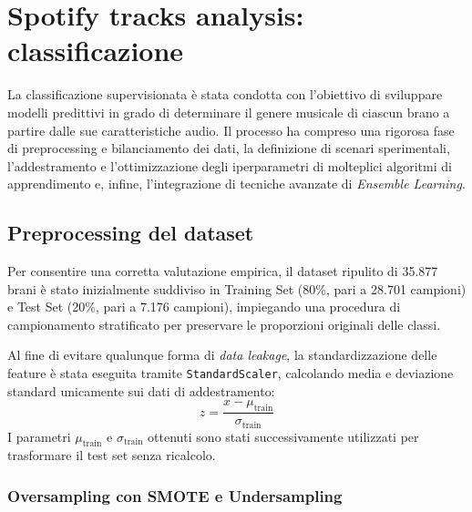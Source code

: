 \section{Spotify tracks analysis: classificazione}

La classificazione supervisionata è stata condotta con l'obiettivo di sviluppare modelli predittivi in grado di determinare il genere musicale di ciascun brano a partire dalle sue caratteristiche audio. Il processo ha compreso una rigorosa fase di preprocessing e bilanciamento dei dati, la definizione di scenari sperimentali, l'addestramento e l'ottimizzazione degli iperparametri di molteplici algoritmi di apprendimento e, infine, l'integrazione di tecniche avanzate di \textit{Ensemble Learning}.

\subsection{Preprocessing del dataset}

Per consentire una corretta valutazione empirica, il dataset ripulito di 35.877 brani è stato inizialmente suddiviso in Training Set (80\%, pari a 28.701 campioni) e Test Set (20\%, pari a 7.176 campioni), impiegando una procedura di campionamento stratificato per preservare le proporzioni originali delle classi.

Al fine di evitare qualunque forma di \textit{data leakage}, la standardizzazione delle feature è stata eseguita tramite \texttt{StandardScaler}, calcolando media e deviazione standard unicamente sui dati di addestramento:
\begin{equation}
z = \frac{x - \mu_{\text{train}}}{\sigma_{\text{train}}}
\label{eq:standardizzazione}
\end{equation}
I parametri $\mu_{\text{train}}$ e $\sigma_{\text{train}}$ ottenuti sono stati successivamente utilizzati per trasformare il test set senza ricalcolo.

\subsubsection{Oversampling con SMOTE e Undersampling}

